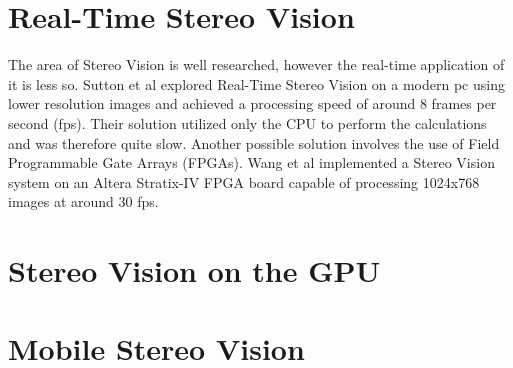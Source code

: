 \section{Real-Time Stereo Vision}
The area of Stereo Vision is well researched, however the real-time application of it is less so.  Sutton et al \cite{Sutton} explored Real-Time Stereo Vision on a modern pc using lower resolution images and achieved a processing speed of around 8 frames per second (fps).  Their solution utilized only the CPU to perform the calculations and was therefore quite slow.  Another possible solution involves the use of Field Programmable Gate Arrays (FPGAs).  Wang et al\cite{Wang:2} implemented a Stereo Vision system on an Altera Stratix-IV FPGA board capable of processing 1024x768 images at around 30 fps. 

\section{Stereo Vision on the GPU}


\section{Mobile Stereo Vision}

